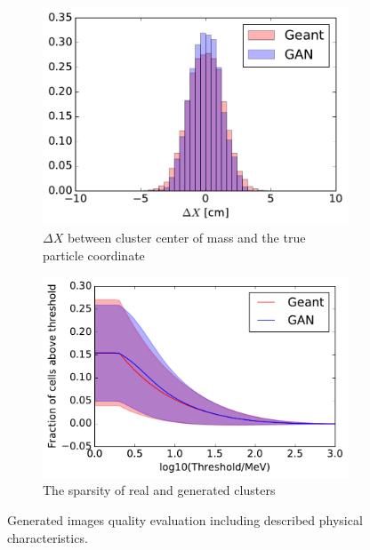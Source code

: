 \documentclass{PoS}
\begin{document}
\begin{figure}[htb]
\begin{center}
\begin{subfigure}[t]{0.3\textwidth}
    \includegraphics[width=1\textwidth]{figures/deltaX.pdf}
    \caption{$\Delta X$ between cluster center of mass and the true particle coordinate}
  \end{subfigure}\hspace{0.2\textwidth}
  \begin{subfigure}[t]{0.3\textwidth}
    \includegraphics[width=1\textwidth]{figures/sparsity.pdf}
    \caption{The sparsity of real and generated clusters}
  \end{subfigure}
\end{center}
 \caption{Generated images quality evaluation including described
   physical characteristics.}\label{fig:ganquality}
\end{figure}
\end{document}
